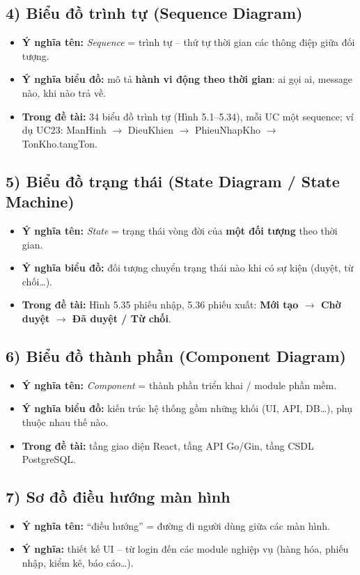 \documentclass[12pt,a4paper]{article}
\begin{document}
\begin{cauhoi}
\subsection*{4) Biểu đồ trình tự (Sequence Diagram)}
\begin{itemize}[leftmargin=1.4em,itemsep=3pt]
  \item \textbf{Ý nghĩa tên:} \textit{Sequence} = trình tự -- thứ tự thời gian các thông điệp giữa đối tượng.
  \item \textbf{Ý nghĩa biểu đồ:} mô tả \textbf{hành vi động theo thời gian}: ai gọi ai, message nào, khi nào trả về.
  \item \textbf{Trong đề tài:} 34 biểu đồ trình tự (Hình 5.1--5.34), mỗi UC một sequence; ví dụ UC23: ManHinh $\rightarrow$ DieuKhien $\rightarrow$ PhieuNhapKho $\rightarrow$ TonKho.tangTon.
\end{itemize}

\subsection*{5) Biểu đồ trạng thái (State Diagram / State Machine)}
\begin{itemize}[leftmargin=1.4em,itemsep=3pt]
  \item \textbf{Ý nghĩa tên:} \textit{State} = trạng thái vòng đời của \textbf{một đối tượng} theo thời gian.
  \item \textbf{Ý nghĩa biểu đồ:} đối tượng chuyển trạng thái nào khi có sự kiện (duyệt, từ chối\ldots).
  \item \textbf{Trong đề tài:} Hình 5.35 phiếu nhập, 5.36 phiếu xuất: \textbf{Mới tạo $\rightarrow$ Chờ duyệt $\rightarrow$ Đã duyệt / Từ chối}.
\end{itemize}

\subsection*{6) Biểu đồ thành phần (Component Diagram)}
\begin{itemize}[leftmargin=1.4em,itemsep=3pt]
  \item \textbf{Ý nghĩa tên:} \textit{Component} = thành phần triển khai / module phần mềm.
  \item \textbf{Ý nghĩa biểu đồ:} kiến trúc hệ thống gồm những khối (UI, API, DB\ldots), phụ thuộc nhau thế nào.
  \item \textbf{Trong đề tài:} tầng giao diện React, tầng API Go/Gin, tầng CSDL PostgreSQL.
\end{itemize}

\subsection*{7) Sơ đồ điều hướng màn hình}
\begin{itemize}[leftmargin=1.4em,itemsep=3pt]
  \item \textbf{Ý nghĩa tên:} ``điều hướng'' = đường đi người dùng giữa các màn hình.
  \item \textbf{Ý nghĩa:} thiết kế UI -- từ login đến các module nghiệp vụ (hàng hóa, phiếu nhập, kiểm kê, báo cáo\ldots).
\end{itemize}
\end{cauhoi}
\end{document}
